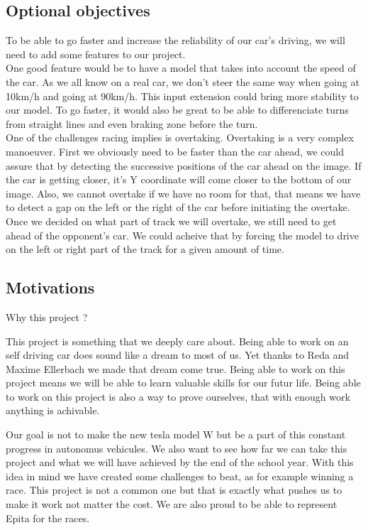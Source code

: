 \documentclass[12pt]{article}
\begin{document}
\subsection{Optional objectives}
To be able to go faster and increase the reliability of our car's driving, we will need to add some features to our project. \\

One good feature would be to have a model that takes into account the speed of the car. As we all know on a real car, we don't steer the same way when going at 10km/h and going at 90km/h. This input extension could bring more stability to our model.
To go faster, it would also be great to be able to differenciate turns from straight lines and even braking zone before the turn. \\

One of the challenges racing implies is overtaking. Overtaking is a very complex manoeuver. First we obviously need to be faster than the car ahead, we could assure that by detecting the successive positions of the car ahead on the image. If the car is getting closer, it's Y coordinate will come closer to the bottom of our image. Also, we cannot overtake if we have no room for that, that means we have to detect a gap on the left or the right of the car before initiating the overtake. Once we decided on what part of track we will overtake, we still need to get ahead of the opponent's car. We could acheive that by forcing the model to drive on the left or right part of the track for a given amount of time.

\subsection{Motivations}
Why this project ? 

This project is something that we deeply care about. Being able to work on an self driving car does sound like a dream to most of us. Yet thanks to Reda and Maxime Ellerbach we made that dream come true. Being able to work on this project means we will be able to learn valuable skills for our futur life. Being able to work on this project is also a way to prove ourselves, that with enough work anything is achivable. 

Our goal is not to make the new tesla model W but be a part of this constant progress in autonomus vehicules. We also want to see how far we can take this project and what we will have achieved by the end of the school year. With this idea in mind we have created some challenges to beat, as for example winning a race. This project is not a common one but that is exactly what pushes us to make it work not matter the cost. We are also proud to be able to represent Epita for the races. 
\end{document}
